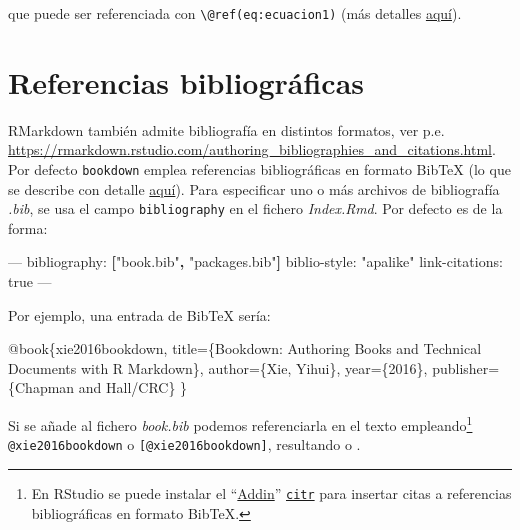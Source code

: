 \documentclass[]{book}
\newenvironment{Shaded}{\begin{snugshade}}{\end{snugshade}}
\newcommand{\KeywordTok}[1]{\textcolor[rgb]{0.13,0.29,0.53}{\textbf{#1}}}
\newcommand{\DataTypeTok}[1]{\textcolor[rgb]{0.13,0.29,0.53}{#1}}
\newcommand{\StringTok}[1]{\textcolor[rgb]{0.31,0.60,0.02}{#1}}
\newcommand{\OtherTok}[1]{\textcolor[rgb]{0.56,0.35,0.01}{#1}}
\newcommand{\FunctionTok}[1]{\textcolor[rgb]{0.00,0.00,0.00}{#1}}
\newcommand{\VariableTok}[1]{\textcolor[rgb]{0.00,0.00,0.00}{#1}}
\newcommand{\AttributeTok}[1]{\textcolor[rgb]{0.77,0.63,0.00}{#1}}
\newcommand{\NormalTok}[1]{#1}
\let\rmarkdownfootnote\footnote%
\def\footnote{\protect\rmarkdownfootnote}
\theoremstyle{definition}
\theoremstyle{definition}
\theoremstyle{definition}
\theoremstyle{remark}
\begin{document}
que puede ser referenciada con
\texttt{\textbackslash{}@ref(eq:ecuacion1)} (más detalles
\href{https://bookdown.org/yihui/bookdown/markdown-extensions-by-bookdown.html\#equations}{aquí}).

\section{Referencias bibliográficas}\label{referencias-bibliograficas}

RMarkdown también admite bibliografía en distintos formatos, ver p.e.
\url{https://rmarkdown.rstudio.com/authoring_bibliographies_and_citations.html}.
Por defecto \texttt{bookdown} emplea referencias bibliográficas en
formato BibTeX (lo que se describe con detalle
\href{https://bookdown.org/yihui/bookdown/citations.html}{aquí}). Para
especificar uno o más archivos de bibliografía \emph{.bib}, se usa el
campo \texttt{bibliography} en el fichero \emph{Index.Rmd}. Por defecto
es de la forma:

\begin{Shaded}
\begin{Highlighting}[]
\OtherTok{---}
\FunctionTok{bibliography:}\AttributeTok{ }\KeywordTok{[}\StringTok{"book.bib"}\KeywordTok{,} \StringTok{"packages.bib"}\KeywordTok{]}
\FunctionTok{biblio-style:}\AttributeTok{ }\StringTok{"apalike"}
\FunctionTok{link-citations:}\AttributeTok{ true}
\OtherTok{---}
\end{Highlighting}
\end{Shaded}

Por ejemplo, una entrada de BibTeX sería:

\begin{Shaded}
\begin{Highlighting}[]
\VariableTok{@book}\NormalTok{\{}\OtherTok{xie2016bookdown}\NormalTok{,}
  \DataTypeTok{title}\NormalTok{=\{Bookdown: Authoring Books and Technical Documents with R Markdown\},}
  \DataTypeTok{author}\NormalTok{=\{Xie, Yihui\},}
  \DataTypeTok{year}\NormalTok{=\{2016\},}
  \DataTypeTok{publisher}\NormalTok{=\{Chapman and Hall/CRC\}}
\NormalTok{\}}
\end{Highlighting}
\end{Shaded}

Si se añade al fichero \emph{book.bib} podemos referenciarla en el texto
empleando\footnote{En RStudio se puede instalar el
  ``\href{https://rstudio.github.io/rstudioaddins/}{Addin}''
  \href{https://github.com/crsh/citr}{\texttt{citr}} para insertar citas
  a referencias bibliográficas en formato BibTeX.}
\texttt{@xie2016bookdown} o \texttt{{[}@xie2016bookdown{]}}, resultando
\citet{xie2016bookdown} o \citep{xie2016bookdown}.
\end{document}
